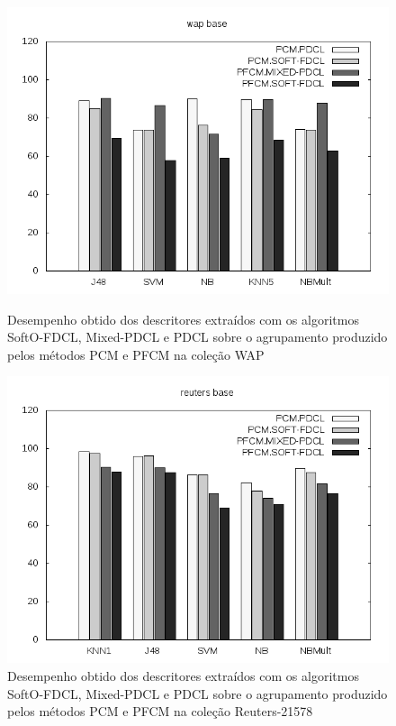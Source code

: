 \begin{figure}[!htp] \centering 
   \begin{minipage}{0.48\textwidth} 
     \centering
    \includegraphics[width=1.0\columnwidth]{assets/pdcl/wap} 
    \caption{Desempenho obtido dos descritores extraídos com os algoritmos SoftO-FDCL, Mixed-PDCL e
    PDCL sobre o agrupamento produzido pelos métodos PCM e PFCM na coleção WAP} 
    \label{fig:pfcmwap}
  \end{minipage}\hfill 
  \begin{minipage}{0.48\textwidth} \centering
    \includegraphics[width=1.0\columnwidth]{assets/pdcl/reuters} 
    \caption{Desempenho obtido dos descritores extraídos com os algoritmos SoftO-FDCL, Mixed-PDCL e
    PDCL sobre o agrupamento produzido pelos métodos PCM e PFCM na coleção Reuters-21578} 
     \label{fig:pfcmreuters} 
   \end{minipage} 
\end{figure}

